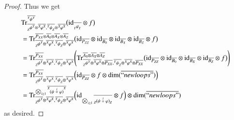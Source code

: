 \documentclass{amsart}
\def\tn{\textnormal}
\def\dim{\tn{dim}}
\def\Trace{\tn{Tr}}
\def\ol{\overline}
\def\id{\tn{id}}
\newcommand{\feeddd}[3]{{\tensor*[^{#2}_{\color{white}{!}}]{{#1}}{^{#3}}}}%
\newcommand{\feeddc}[3]{{\tensor*[^{#2}]{{#1}}{_{#3}}}}
\newcommand{\feedcd}[3]{{\tensor*[_{#2}]{{#1}}{^{#3}}}}
\newcommand{\feedcc}[3]{{\tensor*[^{\color{white}{!}}_{#2}]{{#1}}{_{#3}}}}
\theoremstyle{remark}
\theoremstyle{definition}
\begin{document}
\begin{proof}
Thus we get
\begin{align*}
 &\Trace^{\ol{\feeddd{\psi}{Y}{Y}}}_{\ol{\feedcd{\psi}{Z}{Y}}\otimes\ol{\feeddd{\varphi}{X}{X}},\ol{\feeddc{\psi}{Y}{Z}}\otimes\ol{\feeddd{\varphi}{X}{X}}}
\big(\id_{\ol{\feedcc{\varphi}{Y}{Y}}}\otimes f\big)\\
 &=\Trace^{\ol{P_{XX}}\otimes\ol{A_0}\otimes\ol{A_X}\otimes\ol{A_Z}}_{\ol{\feedcd{\psi}{Z}{Y}}\otimes\ol{\feeddd{\varphi}{X}{X}},\ol{\feeddc{\psi}{Y}{Z}}\otimes\ol{\feeddd{\varphi}{X}{X}}}
\big(\id_{\ol{P_{ZZ}}}\otimes\id_{\ol{B_0}}\otimes\id_{\ol{B_X}}\otimes\id_{\ol{B_Z}}\otimes f\big)\\
 &=\Trace^{\ol{P_{XX}}}_{\ol{\feedcd{\psi}{Z}{Y}}\otimes\ol{\feeddd{\varphi}{X}{X}},\ol{\feeddc{\psi}{Y}{Z}}\otimes\ol{\feeddd{\varphi}{X}{X}}}
 \Bigg(\Trace^{\ol{A_0}\otimes\ol{A_X}\otimes\ol{A_Z}}_{\ol{\feedcd{\psi}{Z}{Y}}\otimes\ol{\feeddd{\varphi}{X}{X}}\otimes\ol{P_{XX}},\ol{\feeddc{\psi}{Y}{Z}}\otimes\ol{\feeddd{\varphi}{X}{X}}\otimes\ol{P_{XX}}}
\big(\id_{\ol{P_{ZZ}}}\otimes\id_{\ol{B_0}}\otimes\id_{\ol{B_X}}\otimes\id_{\ol{B_Z}}\otimes f\big)\Bigg)\\
 &=\Trace^{\ol{P_{XX}}}_{\ol{\feedcd{\psi}{Z}{Y}}\otimes\ol{\feeddd{\varphi}{X}{X}},\ol{\feeddc{\psi}{Y}{Z}}\otimes\ol{\feeddd{\varphi}{X}{X}}}
 \Big(\id_{\ol{P_{ZZ}}}\otimes f\otimes\dim(\ol{``newloops"})\Big)\\
  &=\Trace^{\bigotimes_{i\ge1}\ol{\feeddd{(\psi\;\accentset{i}{\circ}\;\varphi)}{X}{X}}}_{\ol{\feedcd{\psi}{Z}{Y}}\otimes\ol{\feeddd{\varphi}{X}{X}},\ol{\feeddc{\psi}{Y}{Z}}\otimes\ol{\feeddd{\varphi}{X}{X}}}\Big(\id_{\bigotimes_{i\ge1}\ol{\feedcc{(\psi\;\accentset{i}{\circ}\;\varphi)}{Z}{Z}}}\otimes f\Big)\otimes\dim(\ol{``newloops"})
 \end{align*}
 as desired.
 
 \newpage


\end{proof}
\end{document}
